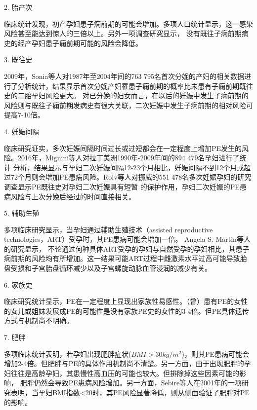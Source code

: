 2. 胎产次

临床统计发现，初产孕妇患子痫前期的可能会增加。多项人口统计显示，这一感染风险甚至能达到惊人的三倍以上\cite{Lee2000,Duckitt2005,Coonrod1995}。另外一项调查研究显示，
没有既往子痫前期病史的经产孕妇患子痫前期可能的风险会降低\cite{Robillard1993}。

3. 既往史

2009年，Sonia等人对1987年至2004年间的763 795名首次分娩的产妇的相关数据进行了分析统计，结果显示首次分娩产妇罹患子痫前期的概率比未患有子痫前期既往史的二胎孕妇风险更大\cite{Sonia2009}。
对已分娩的妇女而言，在以后的妊娠中发生子痫前期的风险则与既往子痫前期发病史有很大关联，二次妊娠中发生子痫前期的相对风险可提高7-10倍\cite{Duckitt2005,CAMPBELL1985,Lie1998,Sibai1986}。

4. 妊娠间隔

临床研究证实，多次妊娠间隔时间过长或过短都会在一定程度上增加PE发生的风险\cite{Rousso2002,Duckitt2005,Conde2007}。2016年，Mignini等人\cite{Mignini2016}对拉丁美洲1990年-2009年间的894 479名孕妇进行了统计
分析，结果显示与孕妇二次妊娠间隔12-23个月相比，妊娠间隔不到12个月或超过72个月则会增加PE患病风险。Rolv\cite{Rolv2002}等人对挪威的551 478名多次妊娠孕妇的研究调查显示PE既往史对孕妇二次妊娠具有短暂
的保护作用，孕妇二次妊娠的PE患病风险与上次分娩后经过的时间直接相关。

5. 辅助生殖

多项临床研究显示，当孕妇通过辅助生殖技术（assisted reproductive technologies，ART）受孕时，其PE患病可能会增加一倍\cite{Jackson2004,Trogstad2009}。 Angela S. Martin等人\cite{Martin2016}的研究显示，
不论通过何种具体ART受孕的孕妇与自然受孕的孕妇相比，其患子痫前期的风险均有所增加。这一结果可能ART过程中雌激素水平过高可能导致胎盘受损和子宫胎盘循环减少以及子宫螺旋动脉血管浸润的减少有关。

6. 家族史

临床研究统计显示，PE在一定程度上显现出家族性易感性\cite{ARNGRIMSSON1990,OAG9,Williams2011}。（曾）患有PE的女性的女儿或姐妹发展成PE的可能性是没有家族PE史的女性的3-4倍\cite{ARNGRIMSSON1990,Cincotta1998,FIGO,Williams2011}。但PE具体遗传方式与机制尚不明确。

7. 肥胖

多项临床统计表明，若孕妇出现肥胖症状($BMI>30kg/m^2$)，则其PE患病可能会增加2-4倍\cite{Williams2011,FIGO,Zintzaras2006}。但肥胖与PE的具体作用机制尚不清楚。另一方面，由于出现肥胖的孕妇往往是高龄孕妇，其患慢性高血压的可能也较大。但排除掉这些因素可能的影响，
肥胖仍然会导致PE患病风险增加\cite{Duckitt2005}。另一方面，Sebire等人\cite{Sebire2001}在2001年的一项研究表明，当孕妇BMI指数<20时，其PE风险显著降低，则从侧面验证了肥胖对PE的影响。

